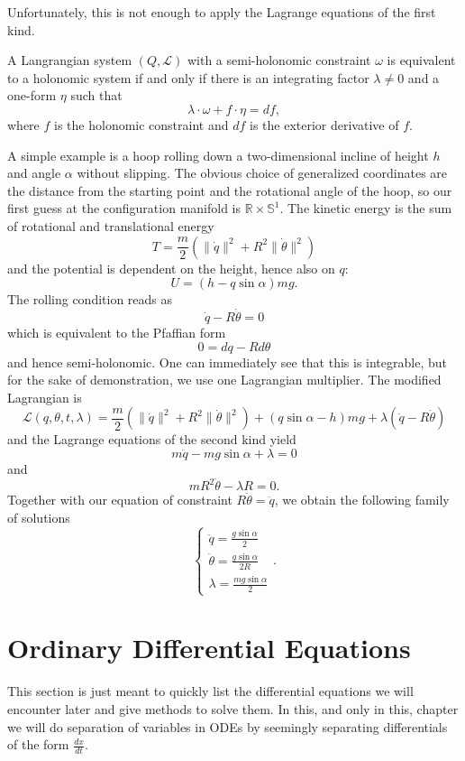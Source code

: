 Unfortunately, this is not enough to apply the Lagrange equations of the first kind.
\begin{theorem}
    A Langrangian system $(Q, \mathcal{L})$ with a semi-holonomic constraint $\omega$ is equivalent to a holonomic system if and only if there is an integrating factor $\lambda \neq 0$ and a one-form $\eta$ such that
    \[
    \lambda \cdot \omega + f \cdot \eta = df,
    \] where $f$ is the holonomic constraint and $df$ is the exterior derivative of $f$. 
\end{theorem}
\begin{eg}
    A simple example is a hoop rolling down a two-dimensional incline of height $h$ and angle $\alpha$ without slipping. The obvious choice of generalized coordinates are the distance from the starting point and the rotational angle of the hoop, so our first guess at the configuration manifold is $\mathbb{R} \times \mathbb{S}^1$. The kinetic energy is the sum of rotational and translational energy
\[
    T= \frac{m}{2}(\|\dot{q}\|^2+R^2 \|\dot{\theta}\|^2)
\] and the potential is dependent on the height, hence also on $q$:
\[
U= (h-q \sin \alpha)mg
.\] The rolling condition reads as
\[
    \dot{q} - R \dot{\theta}=0
\] which is equivalent to the Pfaffian form
\[
0 = dq-Rd\theta
\] and hence semi-holonomic. One can immediately see that this is integrable, but for the sake of demonstration, we use one Lagrangian multiplier. The modified Lagrangian is
\[
    \mathcal{L}(q,\theta,t,\lambda)=\frac{m}{2}(\|\dot{q}\|^2 + R^2 \|\dot{\theta}\|^2) + (q \sin \alpha - h)mg + \lambda (\dot{q}-R\dot{\theta})
\] and the Lagrange equations of the second kind yield
\[
    m\ddot{q}-mg \sin \alpha + \lambda = 0
\] and \[
m R^2 \ddot{\theta}-\lambda R =0
.\]  Together with our equation of constraint $R \ddot{\theta}= \ddot{q}$, we obtain the following family of solutions
\[
\begin{cases}
    \ddot{q}= \frac{g \sin \alpha}{2}\\
    \ddot{\theta} = \frac{g \sin \alpha}{2R}\\
    \lambda = \frac{mg \sin \alpha}{2}
\end{cases}
.\]  
\end{eg}
\section{Ordinary Differential Equations}
This section is just meant to quickly list the differential equations we will encounter later and give methods to solve them. In this, and only in this, chapter we will do separation of variables in ODEs by seemingly separating differentials of the form $\frac{dx}{dt}$.
